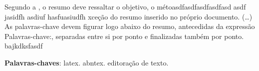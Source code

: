  \setlength{\absparsep}{18pt} %
 \begin{resumo}
 Segundo a , o resumo deve ressaltar o
 objetivo, o m\'{e}toasdfasdfasdfasdfasd asdf jasidfh asdiuf hasfuasiudfh xce\c{c}\~{a}o do resumo inserido no
 pr\'{o}prio documento. (\ldots) As palavras-chave devem figurar logo abaixo do
 resumo, antecedidas da express\~{a}o Palavras-chave:, separadas entre si por
 ponto e finalizadas tamb\'{e}m por ponto. bajkdksfasdf

 \noindent
 \textbf{Palavras-chaves}: latex. abntex. editora\c{c}\~{a}o de texto.
 \end{resumo} 